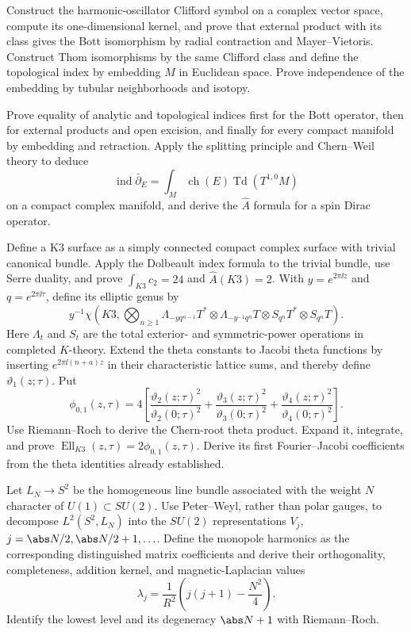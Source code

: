 \begin{exercise}
Construct the harmonic-oscillator Clifford symbol on a complex vector space,
compute its one-dimensional kernel, and prove that external product with its
class gives the Bott isomorphism by radial contraction and Mayer--Vietoris.
Construct Thom isomorphisms by the same Clifford class and define the
topological index by embedding $M$ in Euclidean space.  Prove independence of
the embedding by tubular neighborhoods and isotopy.
\end{exercise}

\begin{exercise}
Prove equality of analytic and topological indices first for the Bott
operator, then for external products and open excision, and finally for every
compact manifold by embedding and retraction.  Apply the splitting principle
and Chern--Weil theory to deduce
\[
 \operatorname{ind}\bar\partial_E
 =\int_M\operatorname{ch}(E)\operatorname{Td}(T^{1,0}M)
\]
on a compact complex manifold, and derive the $\widehat A$ formula for a
spin Dirac operator.
\end{exercise}

\begin{exercise}
Define a K3 surface as a simply connected compact complex surface with
trivial canonical bundle.  Apply the Dolbeault index formula to the trivial
bundle, use Serre duality, and prove $\int_{K3}c_2=24$ and
$\widehat A(K3)=2$.  With
$y=e^{2\pi\ii z}$ and $q=e^{2\pi\ii\tau}$, define its elliptic genus by
\[
 y^{-1}\chi\!\left(K3,\bigotimes_{n\ge1}
 \Lambda_{-yq^{n-1}}T^*\otimes\Lambda_{-y^{-1}q^n}T
 \otimes S_{q^n}T^*\otimes S_{q^n}T\right).
\]
Here $\Lambda_t$ and $S_t$ are the total exterior- and symmetric-power
operations in completed $K$-theory.
Extend the theta constants to Jacobi theta functions by inserting
$e^{2\pi\ii(n+a)z}$ in their characteristic lattice sums, and thereby define
$\vartheta_1(z;\tau)$.  Put
\[
 \phi_{0,1}(z,\tau)=4\left[
 \frac{\vartheta_2(z;\tau)^2}{\vartheta_2(0;\tau)^2}
 +\frac{\vartheta_3(z;\tau)^2}{\vartheta_3(0;\tau)^2}
 +\frac{\vartheta_4(z;\tau)^2}{\vartheta_4(0;\tau)^2}\right].
\]
Use Riemann--Roch to derive the Chern-root theta product.  Expand it,
integrate, and prove
$\operatorname{Ell}_{K3}(z,\tau)=2\phi_{0,1}(z,\tau)$.  Derive its first
Fourier--Jacobi coefficients from the theta identities already established.
\end{exercise}

\begin{exercise}
Let $L_N\to S^2$ be the homogeneous line bundle associated with the weight
$N$ character of $U(1)\subset SU(2)$.  Use Peter--Weyl, rather than polar
gauges, to decompose $L^2(S^2,L_N)$ into the $SU(2)$ representations
$V_j$, $j=\abs N/2,\abs N/2+1,\ldots$.  Define the monopole harmonics as the
corresponding distinguished matrix coefficients and derive their
orthogonality, completeness, addition kernel, and magnetic-Laplacian values
\[
 \lambda_j=\frac1{R^2}\left(j(j+1)-\frac{N^2}{4}\right).
\]
Identify the lowest level and its degeneracy $\abs N+1$ with Riemann--Roch.
\end{exercise}

